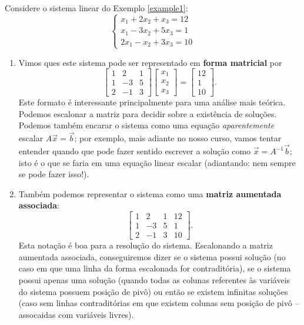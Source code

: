 \documentclass[../livro.tex]{subfiles}  %
\begin{document}
\begin{example}
Considere o sistema linear do Exemplo \ref{example1}:
\[
\left\{
\begin{array}{ll}
x_1 + 2x_2 + x_3 = 12 \\
x_1 -3x_2 + 5x_3 = 1 \\
2x_1 - x_2 + 3x_3 = 10
\end{array}
\right.
\] 
\begin{enumerate}[$(i)$]
\item Vimos ques este sistema pode ser representado em \textbf{forma matricial} por
\[
\left[
\begin{array}{ccc}
1 &  2 & 1  \\
1 & -3 & 5  \\
2 & -1 & 3
\end{array}
\right]
\left[
\begin{array}{c}
x_1   \\
x_2  \\
x_3
\end{array}
\right] =
\left[
\begin{array}{c}
12   \\
1  \\
10
\end{array}
\right].
\] Este formato é interessante principalmente para uma análise mais teórica. Podemos escalonar a matriz para decidir sobre a existência de soluções. Podemos também encarar o sistema como uma equação \textit{aparentemente} escalar $A \vec{x} = \vec{b}$; por exemplo, mais adiante no nosso curso, vamos tentar entender quando que pode fazer sentido escrever a solução como $\vec{x} = A^{-1} \vec{b}$; isto é o que se faria em uma equação linear escalar (adiantando: nem sempre se pode fazer isso!).
\item Também podemos representar o sistema como uma \textbf{matriz aumentada associada}:
\[
\left[
\begin{array}{ccc|c}
1 &  2 & 1 & 12 \\
1 & -3 & 5 &  1 \\
2 & -1 & 3 & 10
\end{array}
\right].
\] Esta notação é boa para a resolução do sistema. Escalonando a matriz aumentada associada, conseguiremos dizer se o sistema possui solução (no caso em que uma linha da forma escalonada for contraditória), se o sistema possui apenas uma solução (quando todas as colunas referentes às variáveis do sistema possuem posição de pivô) ou então se existem infinitas soluções (caso sem linhas contraditórias em que existem colunas sem posição de pivô -- assocaidas com variáveis livres).

\end{enumerate}
\end{example}
\end{document}

